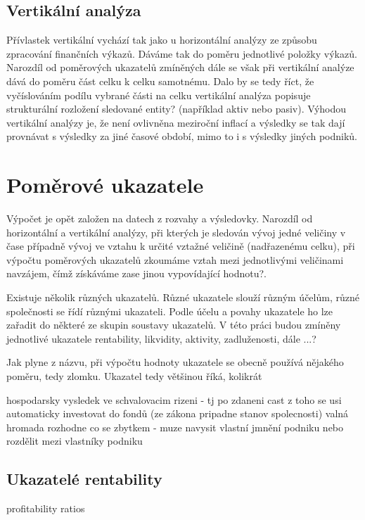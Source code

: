 \subsection{Vertikální analýza}
Přívlastek vertikální vychází tak jako u horizontální analýzy ze způsobu zpracování finančních výkazů. Dáváme tak do poměru jednotlivé položky výkazů. Narozdíl od poměrových ukazatelů zmíněných dále se však při vertikální analýze dává do poměru část celku k celku samotnému. Dalo by se tedy říct, že vyčíslováním podílu vybrané části na celku vertikální analýza popisuje strukturální rozložení sledované entity? (například aktiv nebo pasiv). 
Výhodou vertikální analýzy je, že není ovlivněna meziroční inflací a výsledky se tak dají provnávat s výsledky za jiné časové období, mimo to i s výsledky jiných podniků\cite{sedl}.

\section{Poměrové ukazatele}
Výpočet je opět založen na datech z rozvahy a výsledovky. Narozdíl od horizontální a vertikální analýzy, při kterých je sledován vývoj jedné veličiny v čase případně vývoj ve vztahu k určité vztažné veličině (nadřazenému celku), při výpočtu poměrových ukazatelů zkoumáme vztah mezi jednotlivými veličinami navzájem, čímž získáváme zase jinou vypovídající hodnotu?.

Existuje několik různých ukazatelů. Různé ukazatele slouží různým účelům, různé společnosti se řídí různými ukazateli. Podle účelu a povahy ukazatele ho lze zařadit do některé ze skupin soustavy ukazatelů. V této práci budou zmíněny jednotlivé ukazatele rentability, likvidity, aktivity, zadluženosti, dále ...?

Jak plyne z názvu, při výpočtu hodnoty ukazatele se obecně používá nějakého poměru, tedy zlomku. Ukazatel tedy většinou říká, kolikrát 

hospodarsky vysledek ve schvalovacim rizeni - tj po zdaneni
cast z toho se usi automaticky investovat do fondů (ze zákona pripadne stanov spolecnosti)
valná hromada rozhodne co se zbytkem - muze navysit vlastní jmnění podniku nebo rozdělit mezi vlastníky podniku


\subsection{Ukazatelé rentability}
profitability ratios

